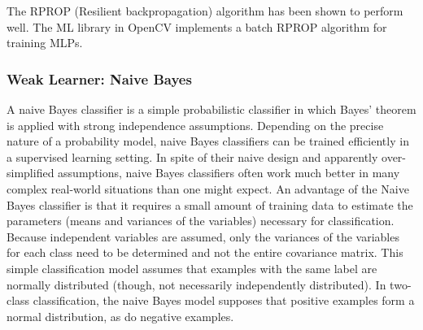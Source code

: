 The RPROP (Resilient backpropagation) \cite{Riedmiller1993} algorithm has been shown to perform well. The ML library in OpenCV implements a batch RPROP algorithm for training MLPs.

% 
% 
\subsubsection{Weak Learner: Naive Bayes}
\label{sec:naivebayes}
A naive Bayes classifier is a simple probabilistic classifier in which Bayes' theorem is applied with strong independence assumptions. Depending on the precise nature of a probability model, naive Bayes classifiers can be trained efficiently in a supervised learning setting. In spite of their naive design and apparently over-simplified assumptions, naive Bayes classifiers often work much better in many complex real-world situations than one might expect. An advantage of the Naive Bayes classifier is that it requires a small amount of training data to estimate the parameters (means and variances of the variables) necessary for classification. Because independent variables are assumed, only the variances of the variables for each class need to be determined and not the entire covariance matrix. This simple classification model assumes that examples with the same label are normally distributed (though, not necessarily independently distributed). In two-class classification, the naive Bayes model supposes that positive examples form a normal distribution, as do negative examples.

